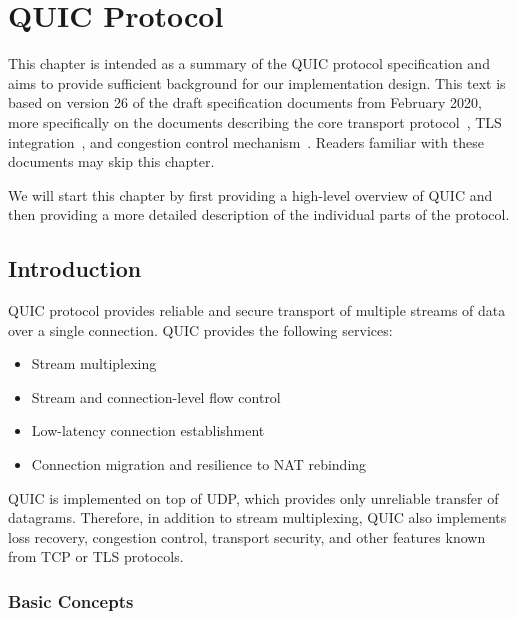 \chapter{QUIC Protocol}\label{chap:02-quic}

This chapter is intended as a summary of the QUIC protocol specification and aims to provide
sufficient background for our implementation design. This text is based on version 26 of the draft
specification documents from February 2020, more specifically on the documents describing the core
transport protocol~\cite{draft-ietf-quic-transport}, TLS integration~\cite{draft-ietf-quic-tls}, and
congestion control mechanism~\cite{draft-ietf-quic-recovery}. Readers familiar with these documents
may skip this chapter.

We will start this chapter by first providing a high-level overview of QUIC and then providing a
more detailed description of the individual parts of the protocol.

\section{Introduction}

QUIC protocol provides reliable and secure transport of multiple streams of data over a single
connection. QUIC provides the following services:

\begin{itemize}

  \item Stream multiplexing

  \item Stream and connection-level flow control

  \item Low-latency connection establishment

  \item Connection migration and resilience to NAT rebinding

\end{itemize}

QUIC is implemented on top of UDP, which provides only unreliable transfer of datagrams. Therefore,
in addition to stream multiplexing, QUIC also implements loss recovery, congestion control,
transport security, and other features known from TCP or TLS protocols.

\subsection{Basic Concepts}

